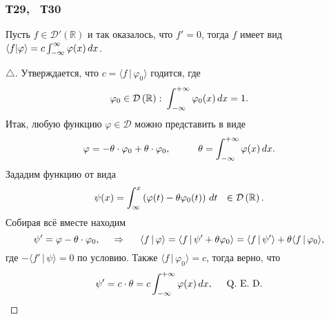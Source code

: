 
\subsubsection*{Т29, \ Т30}



\begin{to_lem}
    Пусть  $f \in \mathcal D' \left(\mathbb{R}\right)$ и так оказалось, что $f' =0$, тогда $f$ имеет вид $\langle f | \varphi \rangle = c \int_{-\infty}^{\infty} \varphi(x) \, d x$.
\end{to_lem}

\begin{proof}[$\triangle$]
    Утверждается, что $c = \langle f \,|\, \varphi_0 \rangle $ годится, где
    \begin{equation*}
        \varphi_0 \in \mathcal D \left(\mathbb{R}\right) \colon  
        \int_{-\infty}^{+\infty}  \varphi_0(x) \, d x = 1.
    \end{equation*}
    Итак, любую функцию $\varphi \in \mathcal D$ можно представить в виде
    \begin{equation*}
        \varphi = - \theta \cdot \varphi_0 + \theta \cdot \varphi_0,
        \hspace{10 mm} 
        \theta = \int_{-\infty}^{+\infty}  \varphi(x) \d x.
    \end{equation*}
    Зададим функцию от вида
    \begin{equation*}
        \psi(x) = \int_{\infty}^{x} \left(
            \varphi(t) - \theta \varphi_0 (t)
        \right) \, d t \ \ \in \mathcal D\left(\mathbb{R}\right).
    \end{equation*}
    Собирая всё вместе находим
    \begin{equation*}
        \psi' = \varphi - \theta \cdot \varphi_0,
        \hspace{0.5cm} \Rightarrow \hspace{0.5cm}
        \langle f \,|\, \varphi \rangle = \langle f \,|\, \psi' + \theta \varphi_0 \rangle = 
        \langle f \,|\, \psi' \rangle + \theta \langle f \,|\, \varphi_0 \rangle,
    \end{equation*}
    где $- \langle f' \,|\, \psi \rangle =0$ по условию. Также $\langle f \,|\, \varphi_0 \rangle  = c$, тогда верно, что
    \begin{equation*}
        \psi' = c \cdot \theta = c \int_{-\infty}^{+\infty}  \varphi(x) \, d x, 
        \hspace{5 mm} 
        \textnormal{Q. E. D.}
    \end{equation*}
\end{proof}


